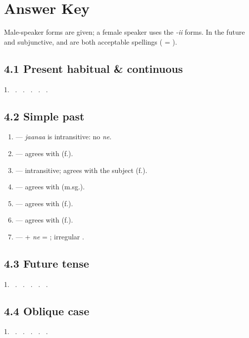 \clearpage
\section{Answer Key}

Male-speaker forms are given; a female speaker uses the \textit{-ii} forms. In the future and subjunctive,  and  are both acceptable spellings ( = ).

\subsection{4.1 Present habitual \& continuous}
1.\  .\  .\  .\  .\  .\ 

\subsection{4.2 Simple past}
\begin{enumerate}
  \item {} — \textit{jaanaa} is intransitive: no \textit{ne}.
  \item {} — agrees with  (f.).
  \item {} — intransitive; agrees with the subject (f.).
  \item {} — agrees with  (m.sg.).
  \item {} — agrees with  (f.).
  \item {} — agrees with  (f.).
  \item {} —  + \textit{ne} = ; irregular .
\end{enumerate}

\subsection{4.3 Future tense}
1.\  .\  .\  .\  .\  .\ 

\subsection{4.4 Oblique case}
1.\  .\  .\  .\  .\  .\ 


